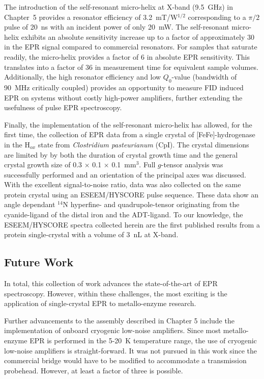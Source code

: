 The introduction of the self-resonant micro-helix at X-band (9.5~GHz) in Chapter~5 provides a resonator efficiency of 3.2~mT/W$^{1/2}$ corresponding to a $\pi/2$ pulse of 20~ns with an incident power of only 20~mW. The self-resonant micro-helix exhibits an absolute sensitivity increase up to a factor of approximately 30 in the EPR signal compared to commercial resonators. For samples that saturate readily, the micro-helix provides a factor of 6 in absolute EPR sensitivity. This translates into a factor of 36 in measurement time for equivalent sample volumes. Additionally, the high resonator efficiency and low $Q_0$-value (bandwidth of 90~MHz critically coupled) provides an opportunity to measure FID induced EPR on systems without costly high-power amplifiers, further extending the usefulness of pulse EPR spectroscopy.

Finally, the implementation of the self-resonant micro-helix has allowed, for the first time, the collection of EPR data from a single crystal of [FeFe]-hydrogenase in the H$_{ox}$ state from {\em Clostridium pasteurianum} (CpI). The crystal dimensions are limited by by both the duration of crystal growth time and the general crystal growth size of 0.3 $\times$ 0.1 $\times$ 0.1~mm$^3$. Full $g$-tensor analysis was successfully performed and an orientation of the principal axes was discussed. With the excellent signal-to-noise ratio, data was also collected on the same protein crystal using an ESEEM/HYSCORE pulse sequence. These data show an angle dependant $^{14}$N hyperfine- and quadrupole-tensor originating from the cyanide-ligand of the distal iron and the ADT-ligand. To our knowledge, the ESEEM/HYSCORE spectra collected herein are the first published results from a protein single-crystal with a volume of 3~nL at X-band. 

\subsection*{Future Work}

In total, this collection of work advances the state-of-the-art of EPR spectroscopy. However, within these challenges, the most exciting is the application of single-crystal EPR to metallo-enzyme research. 

Further advancements to the assembly described in Chapter 5 include the implementation of onboard cryogenic low-noise amplifiers. Since most metallo-enzyme EPR is performed in the 5-20~K temperature range, the use of cryogenic low-noise amplifiers is straight-forward. It was not pursued in this work since the commercial bridge would have to be modified to accommodate a transmission probehead. However, at least a factor of three is possible. \cite{NARKOWICZ201379} 

